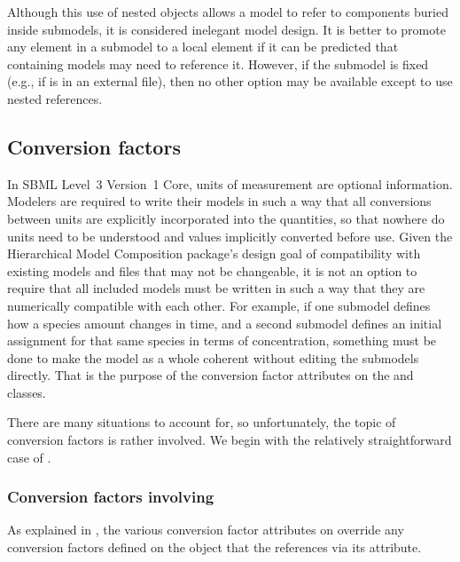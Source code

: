 Although this use of nested \SBaseRef objects allows a model to refer to
components buried inside submodels, it is considered inelegant model
design.  It is better to promote any element in a submodel to a local
element if it can be predicted that containing models may need to
reference it.  However, if the submodel is fixed (e.g., if is in an
external file), then no other option may be available except to use
nested references.



\subsection{Conversion factors}
\label{conversion-factors}

In SBML Level~3 Version~1 Core, units of measurement are optional
information.  Modelers are required to write their models in such a way
that all conversions between units are explicitly incorporated into the
quantities, so that nowhere do units need to be understood and values
implicitly converted before use.  Given the Hierarchical Model
Composition package's design goal of compatibility with existing models
and files that may not be changeable, it is not an option to require
that all included models must be written in such a way that they are
numerically compatible with each other.  For example, if one submodel
defines how a species amount changes in time, and a second submodel
defines an initial assignment for that same species in terms of
concentration, something must be done to make the model as a whole
coherent without editing the submodels directly.  That is the purpose of
the conversion factor attributes on the \Submodel and \ReplacedElement
classes.

There are many situations to account for, so unfortunately, the topic of
conversion factors is rather involved.  We begin with the relatively
straightforward case of \ReplacedElement.


\subsubsection{Conversion factors involving }

As explained in , the various conversion
factor attributes on \ReplacedElement override any conversion factors
defined on the \Submodel object that the \ReplacedElement references via
its  attribute.

